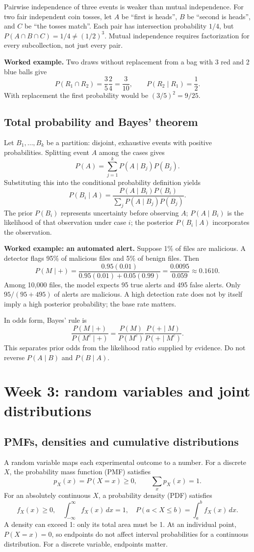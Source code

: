 Pairwise independence of three events is weaker than mutual independence.
For two fair independent coin tosses, let $A$ be ``first is heads'', $B$ be
``second is heads'', and $C$ be ``the tosses match''. Each pair has
intersection probability $1/4$, but
$P(A\cap B\cap C)=1/4\ne(1/2)^3$. Mutual independence requires factorization
for every subcollection, not just every pair.

\textbf{Worked example.} Two draws without replacement from a bag with
3 red and 2 blue balls give
\[
P(R_1\cap R_2)=\frac35\frac24=\frac3{10},\qquad
P(R_2\mid R_1)=\frac12.
\]
With replacement the first probability would be $(3/5)^2=9/25$.

\subsection{Total probability and Bayes' theorem}
Let $B_1,\ldots,B_k$ be a partition: disjoint, exhaustive events with
positive probabilities. Splitting event $A$ among the cases gives
\[
P(A)=\sum_{j=1}^k P(A\mid B_j)P(B_j).
\]
Substituting this into the conditional probability definition yields
\[
P(B_i\mid A)=
\frac{P(A\mid B_i)P(B_i)}{\sum_jP(A\mid B_j)P(B_j)}.
\]
The prior $P(B_i)$ represents uncertainty before observing $A$;
$P(A\mid B_i)$ is the likelihood of that observation under case $i$;
the posterior $P(B_i\mid A)$ incorporates the observation.

\textbf{Worked example: an automated alert.} Suppose 1\% of files are
malicious. A detector flags 95\% of malicious files and 5\% of benign files.
Then
\[
P(M\mid +)=\frac{0.95(0.01)}{0.95(0.01)+0.05(0.99)}
=\frac{0.0095}{0.059}\approx0.1610.
\]
Among 10,000 files, the model expects 95 true alerts and 495 false alerts.
Only $95/(95+495)$ of alerts are malicious. A high detection rate does not
by itself imply a high posterior probability; the base rate matters.

In odds form, Bayes' rule is
\[
\frac{P(M\mid+)}{P(M^c\mid+)}=
\frac{P(M)}{P(M^c)}\frac{P(+\mid M)}{P(+\mid M^c)}.
\]
This separates prior odds from the likelihood ratio supplied by evidence.
Do not reverse $P(A\mid B)$ and $P(B\mid A)$.

\clearpage
\section{Week 3: random variables and joint distributions}
\subsection{PMFs, densities and cumulative distributions}
A random variable maps each experimental outcome to a number. For a
discrete $X$, the probability mass function (PMF) satisfies
\[
p_X(x)=P(X=x)\geq0,\qquad \sum_xp_X(x)=1.
\]
For an absolutely continuous $X$, a probability density (PDF) satisfies
\[
f_X(x)\geq0,\quad \int_{-\infty}^{\infty}f_X(x)\,dx=1,\quad
P(a<X\leq b)=\int_a^b f_X(x)\,dx.
\]
A density can exceed 1: only its total area must be 1. At an individual
point, $P(X=x)=0$, so endpoints do not affect interval probabilities for a
continuous distribution. For a discrete variable, endpoints matter.

